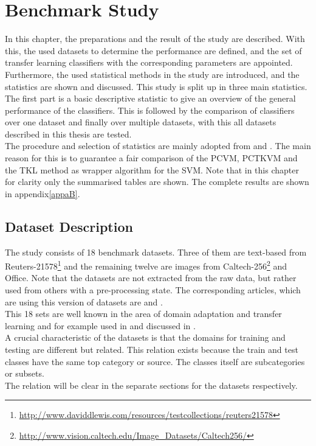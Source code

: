 \chapter{Benchmark Study}\label{EmChap}
In this chapter, the preparations and the result of the study are described.
With this, the used datasets to determine the performance are defined, and the set of transfer learning classifiers with the corresponding parameters are appointed.\\
Furthermore, the used statistical methods in the study are introduced, and the statistics are shown and discussed.
This study is split up in three main statistics.
The first part is a basic descriptive statistic to give an overview of the general performance of the classifiers.
This is followed by the comparison of classifiers over one dataset and finally over multiple datasets, with this all datasets described in this thesis are tested.\\
The procedure and selection of statistics are mainly adopted from \cite{Chen.2009} and \cite{Long.2015}.
The main reason for this is to guarantee a fair comparison of the \acs{PCVM}, \acs{PCTKVM} and the \acs{TKL} method as wrapper algorithm for the \acs{SVM}.
Note that in this chapter for clarity only the summarised tables are shown. The complete results are shown in appendix\ref{appaB}.

\section{Dataset Description}\label{EmSecDaDes}
The study consists of 18 benchmark datasets.
Three of them are text-based from Reuters-21578\footnote{\url{http://www.daviddlewis.com/resources/testcollections/reuters21578}} and the remaining twelve are images from Caltech-256\footnote{\url{http://www.vision.caltech.edu/Image\_Datasets/Caltech256/}} and Office.
Note that the datasets are not extracted from the raw data, but rather used from others with a pre-processing state.
The corresponding articles, which are using this version of datasets are \cite{Gong.} and \cite{Long.2015}.
\\
This 18 sets are well known in the area of domain adaptation and transfer learning and for example used in 
\cite{Long.2015}\cite{Gong.}\cite{Fernando.}\cite{Long.}\cite{Dai.}\cite{Quattoni.} and discussed in \cite{Pan.2010}.\\
A crucial characteristic of the datasets is that the domains for training and testing are different but related.
This relation exists because the train and test classes have the same top category or source.
The classes itself are subcategories or subsets.\cite{JingGao.2008}\\
The relation will be clear in the separate sections for the datasets respectively.

